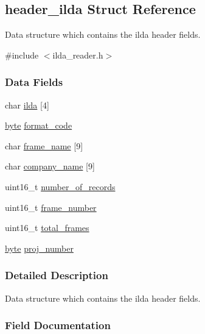 \hypertarget{structheader__ilda}{}\subsection{header\+\_\+ilda Struct Reference}
\label{structheader__ilda}


Data structure which contains the ilda header fields.  




{\ttfamily \#include $<$ilda\+\_\+reader.\+h$>$}

\subsubsection*{Data Fields}
\begin{DoxyCompactItemize}
\item 
char \hyperlink{structheader__ilda_acab5c5e13a661c741491e3d391d2895c}{ilda} \mbox{[}4\mbox{]}
\item 
\hyperlink{ilda__reader_8h_a0c8186d9b9b7880309c27230bbb5e69d}{byte} \hyperlink{structheader__ilda_aaae9f2afe306fb813729a3a510ff4391}{format\+\_\+code}
\item 
char \hyperlink{structheader__ilda_aac9be6f21d28d900a135e2ef2b69021a}{frame\+\_\+name} \mbox{[}9\mbox{]}
\item 
char \hyperlink{structheader__ilda_ab06e9f2a7b6bf9c58179cbf4e7b23a9a}{company\+\_\+name} \mbox{[}9\mbox{]}
\item 
uint16\+\_\+t \hyperlink{structheader__ilda_a95729a0fc0b7cee4780df158f79e991a}{number\+\_\+of\+\_\+records}
\item 
uint16\+\_\+t \hyperlink{structheader__ilda_a723dc14dfda0468bbc2e4fbdac656a08}{frame\+\_\+number}
\item 
uint16\+\_\+t \hyperlink{structheader__ilda_abdbd29a4c96f05535a9bd17e501089d1}{total\+\_\+frames}
\item 
\hyperlink{ilda__reader_8h_a0c8186d9b9b7880309c27230bbb5e69d}{byte} \hyperlink{structheader__ilda_ae3658833789ef3584a0c059680426d00}{proj\+\_\+number}
\end{DoxyCompactItemize}


\subsubsection{Detailed Description}
Data structure which contains the ilda header fields. 

\subsubsection{Field Documentation}
